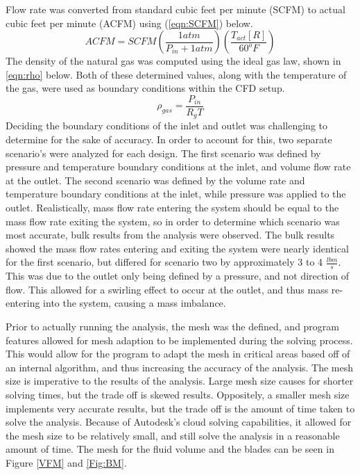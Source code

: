 \documentclass[12pt]{article}
\begin{document}
\hspace{0.5 in}Flow rate was converted from standard cubic feet per minute (SCFM) to actual cubic feet per minute (ACFM) using (\ref{eqn:SCFM}) below.
 \begin{equation}
{ACFM} = {SCFM}({\frac{1 atm}{P_{in}+1 atm}})(\frac{T_{act} [R]}{60^{o}F})
\label{eqn:SCFM}
\end{equation}
The density of the natural gas was computed using the ideal gas law, shown in \ref{eqn:rho} below. Both of these determined values, along with the temperature of the gas, were used as boundary conditions within the CFD setup.
\begin{equation}
\rho_{gas} = \frac{P_{in}}{R_{g}T} 
\label{eqn:rho}
\end{equation}
\hspace{0.5 in}Deciding the boundary conditions of the inlet and outlet was challenging to determine for the sake of accuracy. In order to account for this, two separate scenario's were analyzed for each design. The first scenario was defined by pressure and temperature boundary conditions at the inlet, and volume flow rate at the outlet. The second scenario was defined by the volume rate and temperature boundary conditions at the inlet, while pressure was applied to the outlet. Realistically, mass flow rate entering the system should be equal to the mass flow rate exiting the system, so in order to determine which scenario was most accurate, bulk results from the analysis were observed. The bulk results showed the mass flow rates entering and exiting the system were nearly identical for the first scenario, but differed for scenario two by approximately 3 to 4 $\frac{lbm}{s}$. This was due to the outlet only being defined by a pressure, and not direction of flow. This allowed for a swirling effect to occur at the outlet, and thus mass re-entering into the system, causing a mass imbalance. 

\hspace{0.5 in}Prior to actually running the analysis, the mesh was the defined, and program features allowed for mesh adaption to be implemented during the solving process. This would allow for the program to adapt the mesh in critical areas based off of an internal algorithm, and thus increasing the accuracy of the analysis. The mesh size is imperative to the results of the analysis. Large mesh size causes for shorter solving times, but the trade off is skewed results. Oppositely, a smaller mesh size implements very accurate results, but the trade off is the amount of time taken to solve the analysis. Because of Autodesk's cloud solving capabilities, it allowed for the mesh size to be relatively small, and still solve the analysis in a reasonable amount of time. The mesh for the fluid volume and the blades can be seen in Figure \ref{VFM} and \ref{Fig:BM}.\\
\end{document}
